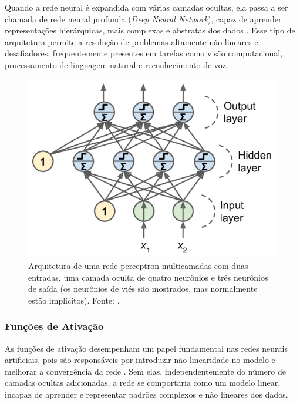 Quando a rede neural é expandida com várias camadas ocultas, ela passa a ser chamada de rede neural profunda (\textit{Deep Neural Network}), capaz de aprender representações hierárquicas, mais complexas e abstratas dos dados \citep{AurlienGron2019}. Esse tipo de arquitetura permite a resolução de problemas altamente não lineares e desafiadores, frequentemente presentes em tarefas como visão computacional, processamento de linguagem natural e reconhecimento de voz.

\begin{figure}[h]
    \centering
    \includegraphics[width=\linewidth]{figs/multilayer-perceptron.png}
    \caption{Arquitetura de uma rede perceptron multicamadas com duas entradas, uma camada oculta de quatro neurônios e três neurônios de saída (os neurônios de viés são mostrados, mas normalmente estão implícitos). Fonte: \cite{AurlienGron2019}.}
    \label{fig:multilayer-perceptron}
\end{figure}

\subsubsection{Funções de Ativação}

As funções de ativação desempenham um papel fundamental nas redes neurais artificiais, pois são responsáveis por introduzir não linearidade no modelo e melhorar a convergência da rede \citep{Dubey2022}. Sem elas, independentemente do número de camadas ocultas adicionadas, a rede se comportaria como um modelo linear, incapaz de aprender e representar padrões complexos e não lineares dos dados.

